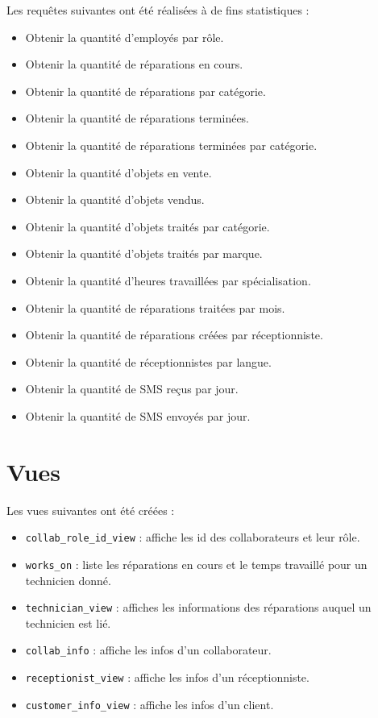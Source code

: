 \documentclass{article}
\newcommand{\ttt}{\texttt}
\begin{document}
    Les requêtes suivantes ont été réalisées à de fins statistiques :
    \begin{itemize}
        \item Obtenir la quantité d'employés par rôle.
        \item Obtenir la quantité de réparations en cours.
        \item Obtenir la quantité de réparations par catégorie.
        \item Obtenir la quantité de réparations terminées.
        \item Obtenir la quantité de réparations terminées par catégorie.
        \item Obtenir la quantité d'objets en vente.
        \item Obtenir la quantité d'objets vendus.
        \item Obtenir la quantité d'objets traités par catégorie.
        \item Obtenir la quantité d'objets traités par marque.
        \item Obtenir la quantité d'heures travaillées par spécialisation.
        \item Obtenir la quantité de réparations traitées par mois.
        \item Obtenir la quantité de réparations créées par réceptionniste.
        \item Obtenir la quantité de réceptionnistes par langue.
        \item Obtenir la quantité de SMS reçus par jour.
        \item Obtenir la quantité de SMS envoyés par jour.
    \end{itemize}

    \section{Vues}

    Les vues suivantes ont été créées :
    \begin{itemize}
        \item \ttt{collab\_role\_id\_view} : affiche les id des collaborateurs et leur rôle.
        \item \ttt{works\_on} : liste les réparations en cours et le temps travaillé pour un technicien donné.
        \item \ttt{technician\_view} : affiches les informations des réparations auquel un technicien est lié.
        \item \ttt{collab\_info} : affiche les infos d'un collaborateur.
        \item \ttt{receptionist\_view} : affiche les infos d'un réceptionniste.
        \item \ttt{customer\_info\_view} : affiche les infos d'un client.
    \end{itemize}
\end{document}
